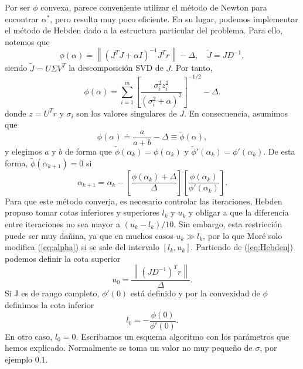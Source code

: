 \documentclass[11pt,a4paper]{book}
\theoremstyle{definition}
\theoremstyle{remark}
\newcommand{\norm}[1]{\left\lVert#1\right\rVert}
\begin{document}
Por ser $\phi$ convexa, parece conveniente utilizar el método de Newton para encontrar $\alpha^*$,
pero resulta muy poco eficiente. En su lugar, podemos implementar el método de Hebden
\cite{Hebden1973AnAF} dado a la estructura particular del problema. Para ello, notemos que
\begin{equation}\label{eq:Hebden}
	\phi(\alpha) = \norm{(J^TJ+\alpha I)^{-1}J^Tr}-\Delta, \quad \tilde{J} = JD^{-1},
\end{equation}
siendo $\tilde{J}=U\Sigma V^T$ la descomposición SVD de $J$. Por tanto,
\begin{equation}
	\phi(\alpha) = \sum_{i=1}^m \left[\frac{\sigma_i^2z_i^2}
											{(\sigma_i^2+\alpha)^2}\right]^{-1/2}-\Delta.
\end{equation}
donde $z=U^Tr$ y $\sigma_i$ son los valores singulares de $J$. En consecuencia, asumimos que
\begin{equation}
\phi(\alpha) \doteq \frac{a}{a+b}-\Delta \equiv \tilde{\phi}(\alpha),
\end{equation}
y elegimos $a$ y $b$ de forma que $\tilde{\phi}(\alpha_k)=\phi(\alpha_k)$ y
$\tilde{\phi}'(\alpha_k)=\phi'(\alpha_k)$. De esta forma, $\tilde{\phi}(\alpha_{k+1})=0$
si
\begin{equation}\label{eq:alpha}
	\alpha_{k+1} = \alpha_k - \left[\frac{\phi(\alpha_k)+\Delta}{\Delta}\right]
					\left[\frac{\phi(\alpha_k)}{\phi'(\alpha_k)}\right].
\end{equation}
Para que este método converja, es necesario controlar las iteraciones, Hebden propuso tomar cotas
inferiores y superiores $l_k$ y $u_k$ y obligar a que la diferencia entre iteraciones
no sea mayor a $(u_k-l_k)/10$. Sin embargo, esta restricción puede ser muy dañina, ya que
en muchos casos $u_k\gg l_k$, por lo que Moré solo modifica (\ref{eq:alpha}) si se sale del intervalo
$[l_k, u_k]$. Partiendo de (\ref{eq:Hebden}) podemos definir la cota superior
\begin{equation}
	u_0 = \frac{\norm{(JD^{-1})^Tr}}{\Delta}.
\end{equation}
Si J es de rango completo, $\phi'(0)$ está definido y por la convexidad de $\phi$
definimos la cota inferior
\begin{equation}
	l_0 = -\frac{\phi(0)}{\phi'(0)}.
\end{equation}
En otro caso, $l_0=0$. Escribamos un esquema algoritmo con los parámetros que hemos
explicado. Normalmente se toma un valor no muy pequeño de $\sigma$, por ejemplo $0.1$.
\end{document}
